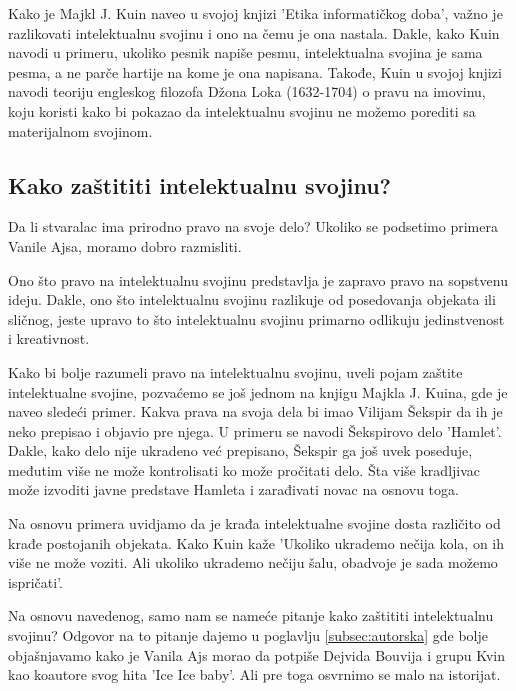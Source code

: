 \documentclass[a4paper]{article}
\begin{document}
Kako je Majkl J. Kuin naveo u svojoj knjizi 'Etika informatičkog doba', \cite{ethics} važno je razlikovati 
intelektualnu svojinu i ono na čemu je ona nastala. Dakle, kako Kuin navodi u primeru, ukoliko pesnik
napiše pesmu, intelektualna svojina je sama pesma, a ne parče hartije na kome je ona napisana.
Takođe, Kuin u svojoj knjizi navodi teoriju engleskog filozofa Džona Loka (1632-1704) o pravu na imovinu,
koju koristi kako bi pokazao da intelektualnu svojinu ne možemo porediti sa materijalnom svojinom.

\subsection{Kako zaštititi intelektualnu svojinu?}
Da li stvaralac ima prirodno pravo na svoje delo? Ukoliko se podsetimo primera Vanile Ajsa, moramo
dobro razmisliti.

Ono što pravo na intelektualnu svojinu predstavlja je zapravo pravo na sopstvenu ideju. Dakle, ono što 
intelektualnu svojinu razlikuje od posedovanja objekata ili sličnog, jeste upravo to što intelektualnu
svojinu primarno odlikuju jedinstvenost i kreativnost.

Kako bi bolje razumeli pravo na intelektualnu svojinu, uveli pojam zaštite intelektualne svojine,
pozvaćemo se još jednom na knjigu Majkla J. Kuina, \cite{ethics} gde je naveo sledeći primer.
Kakva prava na svoja dela bi imao Vilijam Šekspir da ih je neko prepisao i objavio pre njega. U primeru se navodi
Šekspirovo delo 'Hamlet'. Dakle, kako delo nije ukradeno već prepisano, Šekspir ga još uvek poseduje, međutim
više ne može kontrolisati ko može pročitati delo. Šta više  kradljivac može izvoditi javne predstave
Hamleta i zarađivati novac na osnovu toga.

Na osnovu primera uvidjamo da je krađa intelektualne svojine dosta različito od krađe postojanih objekata.
Kako Kuin kaže 'Ukoliko ukrademo nečija kola, on ih više ne može voziti. Ali ukoliko ukrademo nečiju šalu, 
obadvoje je sada možemo ispričati'.

Na osnovu navedenog, samo nam se nameće pitanje kako zaštititi intelektualnu svojinu? Odgovor na to pitanje
dajemo u poglavlju \ref{subsec:autorska} gde bolje objašnjavamo kako je Vanila Ajs morao da potpiše Dejvida Bouvija i grupu
Kvin kao koautore svog hita 'Ice Ice baby'. Ali pre toga osvrnimo se malo na istorijat.

\end{document}
